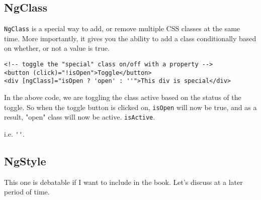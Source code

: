 \subsection{NgClass}
\lstinline{NgClass} is a special way to add, or remove multiple CSS classes 
at the same time. More importantly, it gives you the ability to add a class 
conditionally based on whether, or not a value is true. 
\begin{lstlisting}
<!-- toggle the "special" class on/off with a property -->
<button (click)="!isOpen">Toggle</button>
<div [ngClass]="isOpen ? 'open' : ''">This div is special</div>
\end{lstlisting}

In the above code, we are toggling the class active based on the status of 
the toggle. So when the toggle button is clicked on, \lstinline{isOpen} will 
now be true, and as a result, "open" class will now be active. 
\lstinline{isActive}. 

 i.e. \lstinline{''}. 

 \subsection{ NgStyle }
This one is debatable if I want to include in the book. Let's discuss at a
later period of time. 

